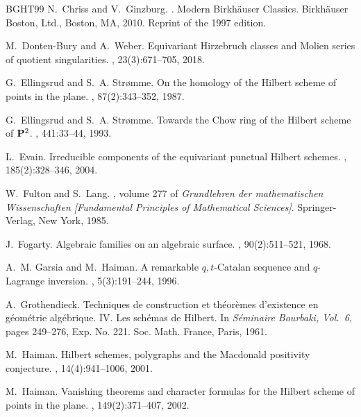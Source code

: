 \documentclass[12pt,a4paper]{amsart}
\theoremstyle{plain}
\theoremstyle{definition}
\theoremstyle{remark}
\begin{document}
\begin{thebibliography}{BGHT99}
	N.~Chriss and V.~Ginzburg.
	.
	\newblock Modern Birkh\"{a}user Classics. Birkh\"{a}user Boston, Ltd., Boston,
	MA, 2010.
	\newblock Reprint of the 1997 edition.
	
	M.~Donten-Bury and A.~Weber.
	\newblock Equivariant {H}irzebruch classes and {M}olien series of quotient
	singularities.
	, 23(3):671--705, 2018.
	
	G.~Ellingsrud and S.~A. Str{\o}mme.
	\newblock On the homology of the {H}ilbert scheme of points in the plane.
	, 87(2):343--352, 1987.
	
	G.~Ellingsrud and S.~A. Str{\o}mme.
	\newblock Towards the {C}how ring of the {H}ilbert scheme of {${\bf P}^2$}.
	, 441:33--44, 1993.
	
	L.~Evain.
	\newblock Irreducible components of the equivariant punctual {H}ilbert schemes.
	, 185(2):328--346, 2004.
	
	W.~Fulton and S.~Lang.
	, volume 277 of {\em Grundlehren der
		mathematischen Wissenschaften [Fundamental Principles of Mathematical
		Sciences]}.
	\newblock Springer-Verlag, New York, 1985.
	
	J.~Fogarty.
	\newblock Algebraic families on an algebraic surface.
	, 90(2):511--521, 1968.
	
	A.~M. Garsia and M.~Haiman.
	\newblock A remarkable {$q,t$}-{C}atalan sequence and {$q$}-{L}agrange
	inversion.
	, 5(3):191--244, 1996.
	
	A.~Grothendieck.
	\newblock Techniques de construction et th\'eor\`emes d'existence en
	g\'eom\'etrie alg\'ebrique. {IV}. {L}es sch\'emas de {H}ilbert.
	\newblock In {\em S\'eminaire {B}ourbaki, {V}ol.\ 6}, pages 249--276, Exp. No.
	221. Soc. Math. France, Paris, 1961.
	
	M.~Haiman.
	\newblock Hilbert schemes, polygraphs and the {M}acdonald positivity
	conjecture.
	, 14(4):941--1006, 2001.
	
	M.~Haiman.
	\newblock Vanishing theorems and character formulas for the {H}ilbert scheme of
	points in the plane.
	, 149(2):371--407, 2002.
	

\end{thebibliography}
\end{document}

